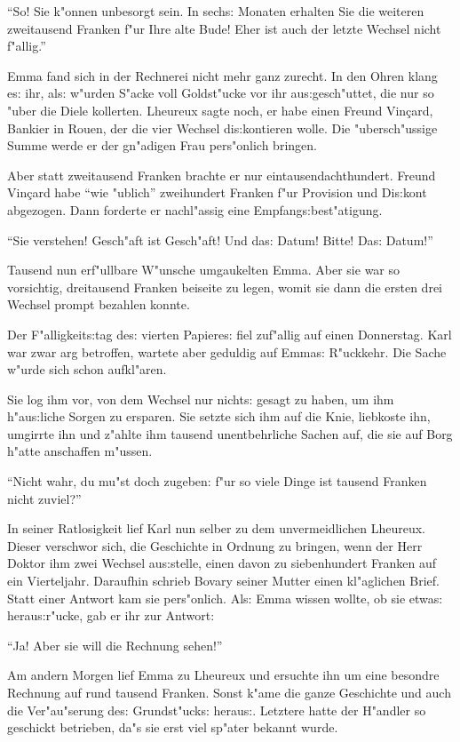 \documentclass[oneside,12pt]{book}
\newcommand{\s}{s:}%
\begin{document}
"`So! Sie k"onnen unbesorgt sein. In sech{\s} Monaten erhalten Sie
die weiteren zweitausend Franken f"ur Ihre alte Bude! Eher ist
auch der letzte Wechsel nicht f"allig."'

Emma fand sich in der Rechnerei nicht mehr ganz zurecht. In den
Ohren klang e{\s} ihr, al{\s} w"urden S"acke voll Goldst"ucke vor
ihr au{\s}gesch"uttet, die nur so "uber die Diele kollerten.
Lheureux sagte noch, er habe einen Freund Vin\c{c}ard, Bankier in
Rouen, der die vier Wechsel di{\s}kontieren wolle. Die
"ubersch"ussige Summe werde er der gn"adigen Frau pers"onlich
bringen.

Aber statt zweitausend Franken brachte er nur eintausendachthundert.
Freund Vin\c{c}ard habe "`wie "ublich"' zweihundert Franken f"ur
Provision und Di{\s}kont abgezogen. Dann forderte er nachl"assig
eine Empfang{\s}best"atigung.

"`Sie verstehen! Gesch"aft ist Gesch"aft! Und da{\s} Datum! Bitte!
Da{\s} Datum!"'

Tausend nun erf"ullbare W"unsche umgaukelten Emma. Aber sie war so
vorsichtig, dreitausend Franken beiseite zu legen, womit sie dann
die ersten drei Wechsel prompt bezahlen konnte.

Der F"alligkeit{\s}tag de{\s} vierten Papiere{\s} fiel zuf"allig
auf einen Donnerstag. Karl war zwar arg betroffen, wartete aber
geduldig auf Emma{\s} R"uckkehr. Die Sache w"urde sich schon
aufkl"aren.

Sie log ihm vor, von dem Wechsel nur nicht{\s} gesagt zu haben, um
ihm h"au{\s}liche Sorgen zu ersparen. Sie setzte sich ihm auf die
Knie, liebkoste ihn, umgirrte ihn und z"ahlte ihm tausend
unentbehrliche Sachen auf, die sie auf Borg h"atte anschaffen
m"ussen.

"`Nicht wahr, du mu"st doch zugeben: f"ur so viele Dinge ist
tausend Franken nicht zuviel?"'

In seiner Ratlosigkeit lief Karl nun selber zu dem unvermeidlichen
Lheureux. Dieser verschwor sich, die Geschichte in Ordnung zu
bringen, wenn der Herr Doktor ihm zwei Wechsel au{\s}stelle, einen
davon zu siebenhundert Franken auf ein Vierteljahr. Daraufhin
schrieb Bovary seiner Mutter einen kl"aglichen Brief. Statt einer
Antwort kam sie pers"onlich. Al{\s} Emma wissen wollte, ob sie
etwa{\s} herau{\s}r"ucke, gab er ihr zur Antwort:

"`Ja! Aber sie will die Rechnung sehen!"'

Am andern Morgen lief Emma zu Lheureux und ersuchte ihn um eine
besondre Rechnung auf rund tausend Franken. Sonst k"ame die ganze
Geschichte und auch die Ver"au"serung de{\s} Grundst"uck{\s}
herau{\s}. Letztere hatte der H"andler so geschickt betrieben,
da"s sie erst viel sp"ater bekannt wurde.
\end{document}
